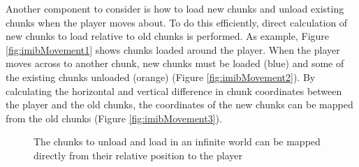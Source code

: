 Another component to consider is how to load new chunks and unload existing chunks when the player moves about. To do this efficiently, direct calculation of new chunks to load relative to old chunks is performed. As example, Figure \ref{fig:imibMovement1} shows chunks loaded around the player. When the player moves across to another chunk, new chunks must be loaded (blue) and some of the existing chunks unloaded (orange) (Figure \ref{fig:imibMovement2}). By calculating the horizontal and vertical difference in chunk coordinates between the player and the old chunks, the coordinates of the new chunks can be mapped from the old chunks (Figure \ref{fig:imibMovement3}).

\begin{figure}[H]
    \centering
    \hfill
    \hfill
    \caption{The chunks to unload and load in an infinite world can be mapped directly from their relative position to the player}
    \label{fig:imibMovement}
\end{figure}

